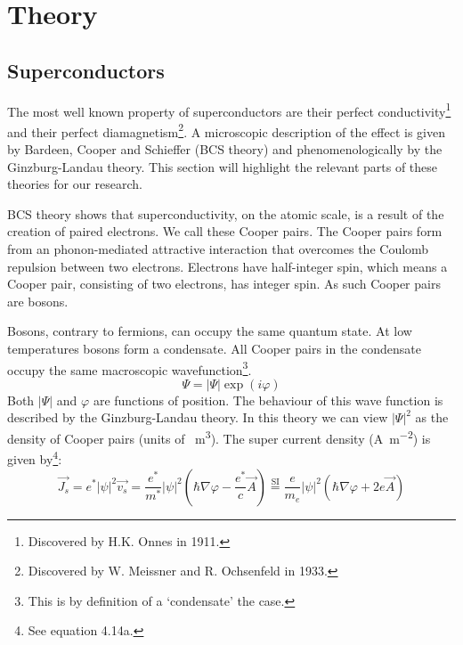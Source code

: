\chapter{Theory}
\section{Superconductors}
The most well known property of superconductors are their perfect conductivity\footnote{Discovered by H.K. Onnes in 1911.} and their perfect diamagnetism\footnote{Discovered by W. Meissner and R. Ochsenfeld in 1933.}. A microscopic description of the effect is given by Bardeen, Cooper and Schieffer (BCS theory) and phenomenologically by the Ginzburg-Landau theory\cite{tinkhamIntroductionSuperconductivity}. This section will highlight the relevant parts of these theories for our research.

BCS theory shows that superconductivity, on the atomic scale, is a result of the creation of paired electrons. We call these Cooper pairs. The Cooper pairs form from an phonon-mediated attractive interaction that overcomes the Coulomb repulsion between two electrons\cite{bardeenTheorySuperconductivity1957}. Electrons have half-integer spin, which means a Cooper pair, consisting of two electrons, has integer spin. As such Cooper pairs are bosons.

Bosons, contrary to fermions, can occupy the same quantum state. At low temperatures bosons form a condensate. All Cooper pairs in the condensate occupy the same macroscopic wavefunction\footnote{This is by definition of a `condensate' the case.}.
\begin{equation}
	\Psi = \left|\Psi\right| \exp(i\varphi)
	\label{eqn:GL-wavefunction}
\end{equation}
Both $\left|\Psi\right|$ and $\varphi$ are functions of position. The behaviour of this wave function is described by the Ginzburg-Landau theory. In this theory we can view $|\Psi|^2$ as the density of Cooper pairs (units of \unit{\per\cubic\meter}). The super current density (\unit{\ampere\per\square\meter}) is given by\footnote{See  equation 4.14a.}:
\begin{equation}
	\vec{J_s} = e^* |\psi|^2 \vec{v_s} = \frac{e^*}{m^*} |\psi|^2 \left(\hbar \nabla \varphi-\frac{e^*}{c} \vec{A}\right) \stackrel{\text{SI}}{=} \frac{e}{m_e} |\psi|^2 \left(\hbar \nabla \varphi + 2e \vec{A}\right)
\end{equation}

